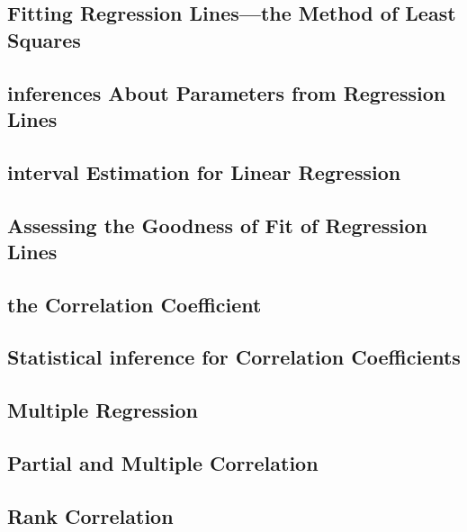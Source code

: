 \documentclass[12pt,]{article}
\theoremstyle{definition}
\theoremstyle{definition}
\theoremstyle{definition}
\theoremstyle{remark}
\begin{document}
\subsection{Fitting Regression Lines---the Method of Least
Squares}\label{fitting-regression-linesthe-method-of-least-squares}

\subsection{inferences About Parameters from Regression
Lines}\label{inferences-about-parameters-from-regression-lines}

\subsection{interval Estimation for Linear
Regression}\label{interval-estimation-for-linear-regression}

\subsection{Assessing the Goodness of Fit of Regression
Lines}\label{assessing-the-goodness-of-fit-of-regression-lines}

\subsection{the Correlation
Coefficient}\label{the-correlation-coefficient}

\subsection{Statistical inference for Correlation
Coefficients}\label{statistical-inference-for-correlation-coefficients}

\subsection{Multiple Regression}\label{multiple-regression}

\subsection{Partial and Multiple
Correlation}\label{partial-and-multiple-correlation}

\subsection{Rank Correlation}\label{rank-correlation}
\end{document}

